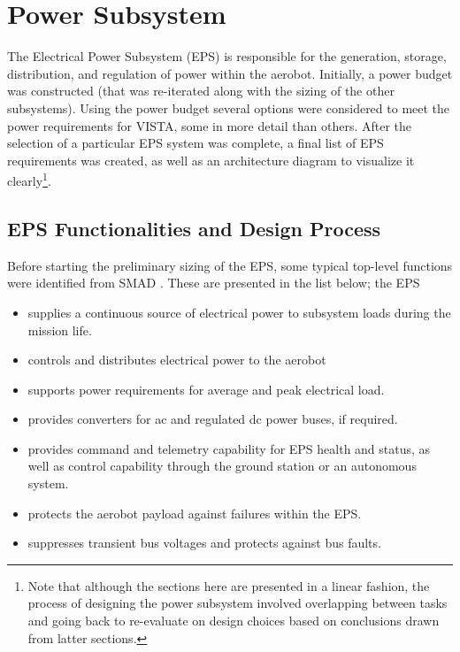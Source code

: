 \chapter{Power Subsystem}
\label{chap:power}

\noindent The Electrical Power Subsystem (EPS) is responsible for the generation, storage, distribution, and regulation of power within the aerobot. Initially, a power budget was constructed (that was re-iterated along with the sizing of the other subsystems). Using the power budget several options were considered to meet the power requirements for VISTA, some in more detail than others. After the selection of a particular EPS system was complete, a final list of EPS requirements was created, as well as an architecture diagram to visualize it clearly\footnote{Note that although the sections here are presented in a linear fashion, the process of designing the power subsystem involved overlapping between tasks and going back to re-evaluate on design choices based on conclusions drawn from latter sections. }.

\section{EPS Functionalities and Design Process}

Before starting the preliminary sizing of the EPS, some typical top-level functions were identified from SMAD \cite{wertz1999smad}. These are presented in the list below; the EPS
\begin{itemize}[itemsep=1pt, parsep=1pt]
    \item supplies a continuous source of electrical power to subsystem loads during the mission life.
    \item controls and distributes electrical power to the aerobot
    \item supports power requirements for average and peak electrical load.
    \item provides converters for ac and regulated dc power buses, if required.
    \item provides command and telemetry capability for EPS health and status, as well as control capability through the ground station or an autonomous system.
    \item protects the aerobot payload against failures within the EPS.
    \item suppresses transient bus voltages and protects against bus faults.
\end{itemize}

